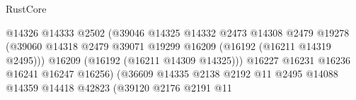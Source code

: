 \begin{lexlean}{RustCore}
\begin{coremodule}
                                                          @14326
                                                          @14333
                                                          @2502
                                                          (@39046
                                                            @14325
                                                            @14332
                                                            @2473
                                                            @14308
                                                            @2479
                                                            @19278
                                                            (@39060
                                                              @14318
                                                              @2479
                                                              @39071
                                                              @19299
                                                              @16209
                                                              (@16192 (@16211 @14319 @2495)))
                                                            @16209
                                                            (@16192 (@16211 @14309 @14325)))
                                                          @16227
                                                          @16231
                                                          @16236
                                                          @16241
                                                          @16247
                                                          @16256)
                                                        (@36609
                                                          @14335
                                                          @2138
                                                          @2192
                                                          @11
                                                          @2495
                                                          @14088
                                                          @14359
                                                          @14418
                                                          @42823
                                                          (@39120
                                                            @2176
                                                            @2191
                                                            @11

\end{coremodule}
\end{lexlean}

